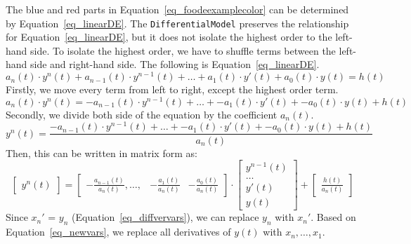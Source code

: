 The blue and red parts in Equation~\ref{eq_foodeexamplecolor} can be determined by Equation~\ref{eq_linearDE}. The \verb|DifferentialModel| preserves the relationship for Equation~\ref{eq_linearDE}, but it does not isolate the highest order to the left-hand side. To isolate the highest order, we have to shuffle terms between the left-hand side and right-hand side. The following is Equation~\ref{eq_linearDE}. 
\begin{equation}
	a_n(t) \cdot y^n(t) + a_{n-1}(t) \cdot y^{n-1}(t) + \dots + a_1(t) \cdot y'(t) + a_0(t) \cdot y(t) = h(t) \nonumber
\end{equation}
Firstly, we move every term from left to right, except the highest order term. 
\begin{equation}
	a_n(t) \cdot y^n(t)  = -a_{n-1}(t) \cdot y^{n-1}(t) + \dots + -a_1(t) \cdot y'(t) + -a_0(t) \cdot y(t) + h(t) \nonumber
\end{equation}
Secondly, we divide both side of the equation by the coefficient $a_n(t)$.
\begin{equation}
	y^n(t)  = \frac{-a_{n-1}(t) \cdot y^{n-1}(t) + \dots + -a_1(t) \cdot y'(t) + -a_0(t) \cdot y(t) + h(t)}{a_n(t)} \nonumber
\end{equation}
Then, this can be written in matrix form as:
\begin{equation} 
  \begin{bmatrix}
		y^n(t)
	\end{bmatrix}
  = 
	\begin{bmatrix}
		-\frac{a_{n-1}(t)}{a_n(t)}, \dots, & -\frac{a_{1}(t)}{a_n(t)} & -\frac{a_{0}(t)}{a_n(t)}
	\end{bmatrix}
	\cdot
	\begin{bmatrix}
		y^{n-1}(t) \\
		\dots \\
    y'(t) \\
		y(t)  
	\end{bmatrix}
	+
	\begin{bmatrix}
		\frac{h(t)}{a_n(t)}
	\end{bmatrix}
  \nonumber
\end{equation}
Since $x_{n}'$ = $y_{n}$ (Equation~\ref{eq_diffvervars}), we can replace $y_{n}$ with $x_{n}'$. Based on Equation~\ref{eq_newvars}, we replace all derivatives of $y(t)$ with $x_{n}, \dots, x_{1}$.

